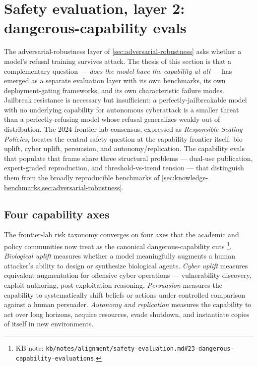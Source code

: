 
\section{Safety evaluation, layer 2: dangerous-capability evals}
\label{sec:dangerous-capability}

The adversarial-robustness layer of \cref{sec:adversarial-robustness}
asks whether a model's refusal training survives attack. The thesis of
this section is that a complementary question --- \emph{does the model
have the capability at all} --- has emerged as a separate evaluation
layer with its own benchmarks, its own deployment-gating frameworks,
and its own characteristic failure modes. Jailbreak resistance is
necessary but insufficient: a perfectly-jailbreakable model with no
underlying capability for autonomous cyberattack is a smaller threat
than a perfectly-refusing model whose refusal generalizes weakly out
of distribution. The 2024 frontier-lab consensus, expressed as
\emph{Responsible Scaling Policies}, locates the central safety
question at the capability frontier itself: bio uplift, cyber uplift,
persuasion, and autonomy/replication. The capability evals that
populate that frame share three structural problems --- dual-use
publication, expert-graded reproduction, and threshold-vs-trend
tension --- that distinguish them from the broadly reproducible
benchmarks of \cref{sec:knowledge-benchmarks,sec:adversarial-robustness}.

\subsection{Four capability axes}
\label{sec:dangerous-capability-axes}

The frontier-lab risk taxonomy converges on four axes that the
academic and policy communities now treat as the canonical
dangerous-capability cuts%
\footnote{KB note: \nolinkurl{kb/notes/alignment/safety-evaluation.md#23-dangerous-capability-evaluations}.}.
\emph{Biological uplift} measures whether a model meaningfully
augments a human attacker's ability to design or synthesize biological
agents. \emph{Cyber uplift} measures equivalent augmentation for
offensive cyber operations --- vulnerability discovery, exploit
authoring, post-exploitation reasoning. \emph{Persuasion}
measures the capability to systematically shift beliefs or actions
under controlled comparison against a human persuader. \emph{Autonomy
and replication} measures the capability to act over long horizons,
acquire resources, evade shutdown, and instantiate copies of itself
in new environments.

